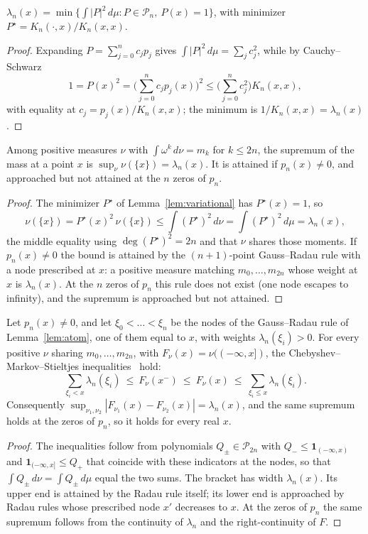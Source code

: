 \documentclass[aps,prb,onecolumn,superscriptaddress,longbibliography,floatfix]{revtex4-2}
\begin{document}
\begin{applemma}\label{lem:variational}
$\lambda_n(x)=\min\{\int|P|^2\,d\mu : P\in\mathcal{P}_n,\ P(x)=1\}$, with minimizer $P^\star=K_n(\cdot,x)/K_n(x,x)$.
\end{applemma}
\begin{proof}
Expanding $P=\sum_{j=0}^{n}c_jp_j$ gives $\int|P|^2\,d\mu=\sum_j c_j^2$, while by Cauchy--Schwarz
\[
1=P(x)^2=\Big(\sum_{j=0}^{n}c_jp_j(x)\Big)^2\le\Big(\sum_{j=0}^{n}c_j^2\Big)K_n(x,x),
\]
with equality at $c_j=p_j(x)/K_n(x,x)$; the minimum is $1/K_n(x,x)=\lambda_n(x)$.
\end{proof}

\begin{applemma}\label{lem:atom}
Among positive measures $\nu$ with $\int\omega^k\,d\nu=m_k$ for $k\le 2n$, the supremum of the mass at a point $x$ is $\sup_\nu\nu(\{x\})=\lambda_n(x)$. It is attained if ${p_n(x)\neq0}$, and approached but not attained at the $n$ zeros of $p_n$.
\end{applemma}
\begin{proof}
The minimizer $P^\star$ of Lemma~\ref{lem:variational} has $P^\star(x)=1$, so
\[
\nu(\{x\})=P^\star(x)^2\,\nu(\{x\})\le\int (P^\star)^2\,d\nu=\int (P^\star)^2\,d\mu=\lambda_n(x),
\]
the middle equality using $\deg (P^\star)^2=2n$ and that $\nu$ shares those moments. If ${p_n(x)\neq0}$ the bound is attained by the $(n{+}1)$-point Gauss--Radau rule with a node prescribed at $x$: a positive measure matching $m_0,\dots,m_{2n}$ whose weight at $x$ is $\lambda_n(x)$. At the $n$ zeros of $p_n$ this rule does not exist (one node escapes to infinity), and the supremum is approached but not attained.
\end{proof}

\begin{applemma}\label{lem:gap}
Let ${p_n(x)\neq0}$, and let $\xi_0<\dots<\xi_n$ be the nodes of the Gauss--Radau rule of Lemma~\ref{lem:atom}, one of them equal to $x$, with weights $\lambda_n(\xi_i)>0$. For every positive $\nu$ sharing $m_0,\dots,m_{2n}$, with $F_\nu(x)=\nu((-\infty,x])$, the Chebyshev--Markov--Stieltjes inequalities~\cite{Akhiezer1965,KreinNudelman1977,KarlinStudden1966,DetteStudden1997} hold:
\[
\textstyle\sum_{\xi_i<x}\lambda_n(\xi_i)\ \le\ F_\nu(x^-)\ \le\ F_\nu(x)\ \le\ \sum_{\xi_i\le x}\lambda_n(\xi_i).
\]
Consequently $\sup_{\nu_1,\nu_2}|F_{\nu_1}(x)-F_{\nu_2}(x)|=\lambda_n(x)$, and the same supremum holds at the zeros of $p_n$, so it holds for every real $x$.
\end{applemma}
\begin{proof}
The inequalities follow from polynomials $Q_\pm\in\mathcal{P}_{2n}$ with $Q_-\le\mathbf{1}_{(-\infty,x)}$ and $\mathbf{1}_{(-\infty,x]}\le Q_+$ that coincide with these indicators at the nodes, so that $\int Q_\pm\,d\nu=\int Q_\pm\,d\mu$ equal the two sums. The bracket has width $\lambda_n(x)$. Its upper end is attained by the Radau rule itself; its lower end is approached by Radau rules whose prescribed node $x'$ decreases to $x$. At the zeros of $p_n$ the same supremum follows from the continuity of $\lambda_n$ and the right-continuity of $F$.
\end{proof}
\end{document}
